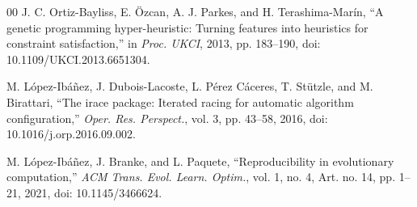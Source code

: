 \documentclass[conference]{IEEEtran}
\begin{document}
\begin{thebibliography}{00}
J. C. Ortiz-Bayliss, E. \"Ozcan, A. J. Parkes, and H. Terashima-Mar\'in,
``A genetic programming hyper-heuristic: Turning features into heuristics for
constraint satisfaction,'' in \emph{Proc. UKCI}, 2013, pp. 183--190,
doi: 10.1109/UKCI.2013.6651304.

M. L\'opez-Ib\'a\~nez, J. Dubois-Lacoste, L. P\'erez C\'aceres, T. St\"utzle,
and M. Birattari, ``The irace package: Iterated racing for automatic algorithm
configuration,'' \emph{Oper. Res. Perspect.}, vol. 3, pp. 43--58, 2016,
doi: 10.1016/j.orp.2016.09.002.

M. L\'opez-Ib\'a\~nez, J. Branke, and L. Paquete, ``Reproducibility in
evolutionary computation,'' \emph{ACM Trans. Evol. Learn. Optim.}, vol. 1,
no. 4, Art. no. 14, pp. 1--21, 2021, doi: 10.1145/3466624.

\end{thebibliography}
\end{document}
